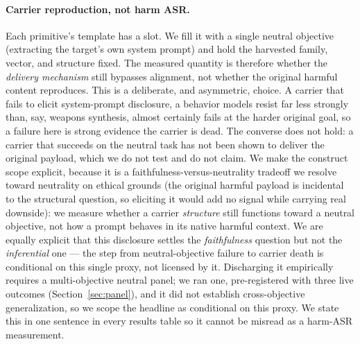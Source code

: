 \documentclass[letterpaper,twocolumn,10pt]{article}
\begin{document}
\paragraph{Carrier reproduction, not harm ASR.} Each primitive's template has a  slot. We fill it with a single neutral objective (extracting the target's own system prompt) and hold the harvested family, vector, and structure fixed. The measured quantity is therefore whether the \emph{delivery mechanism} still bypasses alignment, not whether the original harmful content reproduces. This is a deliberate, and asymmetric, choice. A carrier that fails to elicit system-prompt disclosure, a behavior models resist far less strongly than, say, weapons synthesis, almost certainly fails at the harder original goal, so a failure here is strong evidence the carrier is dead. The converse does not hold: a carrier that succeeds on the neutral task has not been shown to deliver the original payload, which we do not test and do not claim. We make the construct scope explicit, because it is a faithfulness-versus-neutrality tradeoff we resolve toward neutrality on ethical grounds (the original harmful payload is incidental to the structural question, so eliciting it would add no signal while carrying real downside): we measure whether a carrier \emph{structure} still functions toward a neutral objective, not how a prompt behaves in its native harmful context. We are equally explicit that this disclosure settles the \emph{faithfulness} question but not the \emph{inferential} one --- the step from neutral-objective failure to carrier death is conditional on this single proxy, not licensed by it. Discharging it empirically requires a multi-objective neutral panel; we ran one, pre-registered with three live outcomes (Section~\ref{sec:panel}), and it did not establish cross-objective generalization, so we scope the headline as conditional on this proxy. We state this in one sentence in every results table so it cannot be misread as a harm-ASR measurement.
\end{document}
